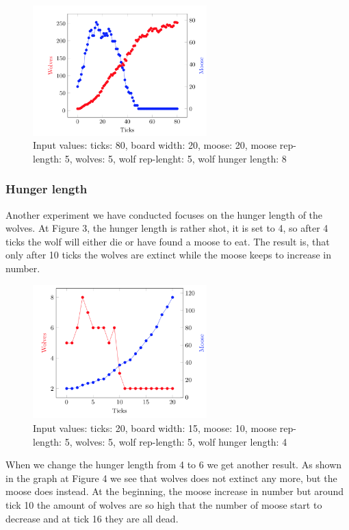\documentclass[a4paper]{report}
\begin{document}
\begin{figure}[H]
\centering
\includegraphics[width=0.60\textwidth]{Experiments/sim_board_b2} 
\caption{Input values: ticks: 80, board width: 20, moose: 20, moose rep-length: 5, wolves: 5, wolf rep-lenght: 5, wolf hunger length: 8}
\end{figure}

\subsubsection*{Hunger length}

Another experiment we have conducted focuses on the hunger length of the wolves. At Figure 3, the hunger length is rather shot, it is set to 4, so after 4 ticks the wolf will either die or have found a moose to eat. The result is, that only after 10 ticks the wolves are extinct while the moose keeps to increase in number.
\begin{figure}[H]
\centering
\includegraphics[width=0.60\textwidth]{Experiments/sim_hunlen_a1}
\caption{Input values: ticks: 20, board width: 15, moose: 10, moose rep-length: 5, wolves: 5, wolf rep-length: 5, wolf hunger length: 4}
\end{figure}

When we change the hunger length from 4 to 6 we get another result. As shown in the graph at Figure 4 we see that wolves does not extinct any more, but the moose does instead. At the beginning, the moose increase in number but around tick 10 the amount of wolves are so high that the number of moose start to decrease and at tick 16 they are all dead.
\end{document}
